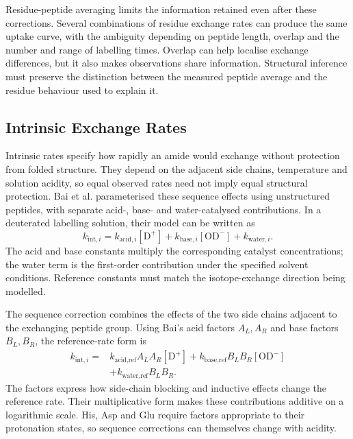 Residue-peptide averaging limits the information retained even after these corrections. Several combinations of residue exchange rates can produce the same uptake curve, with the ambiguity depending on peptide length, overlap and the number and range of labelling times.\supercite{skinnerEstimatingConstraintsProtection2019} Overlap can help localise exchange differences, but it also makes observations share information. Structural inference must preserve the distinction between the measured peptide average and the residue behaviour used to explain it.

\subsection{Intrinsic Exchange Rates}
\label{sec:bg-intrinsic-rates}

Intrinsic rates specify how rapidly an amide would exchange without protection from folded structure. They depend on the adjacent side chains, temperature and solution acidity, so equal observed rates need not imply equal structural protection. Bai et al. parameterised these sequence effects using unstructured peptides, with separate acid-, base- and water-catalysed contributions.\supercite{baiPrimaryStructureEffects1993} In a deuterated labelling solution, their model can be written as
\begin{equation}
    k_{\text{int},i}=
    k_{\text{acid},i}[\mathrm{D}^{+}]
    +k_{\text{base},i}[\mathrm{OD}^{-}]
    +k_{\text{water},i}.
    \label{eq:bg-intrinsic-rate}
\end{equation}
The acid and base constants multiply the corresponding catalyst concentrations; the water term is the first-order contribution under the specified solvent conditions. Reference constants must match the isotope-exchange direction being modelled.\supercite{connellyIsotopeEffectsPeptide1993}

The sequence correction combines the effects of the two side chains adjacent to the exchanging peptide group. Using Bai's acid factors $A_L,A_R$ and base factors $B_L,B_R$, the reference-rate form is
\begin{equation}
    \begin{split}
    k_{\text{int},i}={}&
    k_{\text{acid},\text{ref}}A_LA_R[\mathrm{D}^{+}]
    +k_{\text{base},\text{ref}}B_LB_R[\mathrm{OD}^{-}]\\
    &+k_{\text{water},\text{ref}}B_LB_R.
    \end{split}
    \label{eq:bg-sequence-rates}
\end{equation}
The factors express how side-chain blocking and inductive effects change the reference rate. Their multiplicative form makes these contributions additive on a logarithmic scale. His, Asp and Glu require factors appropriate to their protonation states, so sequence corrections can themselves change with acidity.\supercite{baiPrimaryStructureEffects1993}

